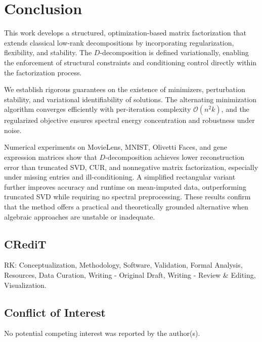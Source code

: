 \documentclass[10pt,a4paper]{article}
\begin{document}
\medskip
\section{Conclusion}
This work develops a structured, optimization-based matrix factorization that extends classical low-rank decompositions by incorporating regularization, flexibility, and stability. The \( D \)-decomposition is defined variationally, enabling the enforcement of structural constraints and conditioning control directly within the factorization process.

We establish rigorous guarantees on the existence of minimizers, perturbation stability, and variational identifiability of solutions. The alternating minimization algorithm converges efficiently with per-iteration complexity \( \mathcal{O}(n^2k) \), and the regularized objective ensures spectral energy concentration and robustness under noise.

Numerical experiments on MovieLens, MNIST, Olivetti Faces, and gene expression matrices show that \( D \)-decomposition achieves lower reconstruction error than truncated SVD, CUR, and nonnegative matrix factorization, especially under missing entries and ill-conditioning. A simplified rectangular variant further improves accuracy and runtime on mean-imputed data, outperforming truncated SVD while requiring no spectral preprocessing. These results confirm that the method offers a practical and theoretically grounded alternative when algebraic approaches are unstable or inadequate.

\subsection*{CRediT}
RK: Conceptualization, Methodology, Software, Validation, Formal Analysis, Resources, Data Curation, Writing - Original Draft, Writing - Review \& Editing, Visualization.

\subsection*{Conflict of Interest}
No potential competing interest was reported by the author(s).

\nolinenumbers




\appendix
\end{document}
